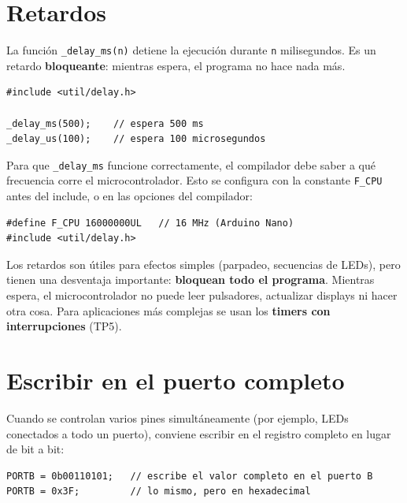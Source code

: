 \section{Retardos}

La función \texttt{\_delay\_ms(n)} detiene la ejecución durante \texttt{n}
milisegundos. Es un retardo \textbf{bloqueante}: mientras espera, el programa no
hace nada más.

\begin{lstlisting}[style=estilo-c]
#include <util/delay.h>

_delay_ms(500);    // espera 500 ms
_delay_us(100);    // espera 100 microsegundos
\end{lstlisting}

\begin{importantebox}
Para que \texttt{\_delay\_ms} funcione correctamente, el compilador debe saber a qué
frecuencia corre el microcontrolador. Esto se configura con la constante \texttt{F\_CPU}
antes del include, o en las opciones del compilador:
\begin{lstlisting}[style=estilo-c]
#define F_CPU 16000000UL   // 16 MHz (Arduino Nano)
#include <util/delay.h>
\end{lstlisting}
\end{importantebox}

Los retardos son útiles para efectos simples (parpadeo, secuencias de LEDs), pero
tienen una desventaja importante: \textbf{bloquean todo el programa}. Mientras
espera, el microcontrolador no puede leer pulsadores, actualizar displays ni hacer
otra cosa. Para aplicaciones más complejas se usan los \textbf{timers con
interrupciones} (TP5).

\section{Escribir en el puerto completo}

Cuando se controlan varios pines simultáneamente (por ejemplo, LEDs conectados a
todo un puerto), conviene escribir en el registro completo en lugar de bit a bit:

\begin{lstlisting}[style=estilo-c]
PORTB = 0b00110101;   // escribe el valor completo en el puerto B
PORTB = 0x3F;         // lo mismo, pero en hexadecimal
\end{lstlisting}

